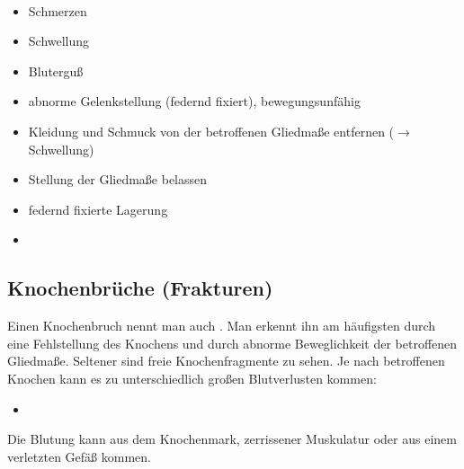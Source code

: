 \paragraph{\TxSymptome}
\begin{itemize}
  \item Schmerzen
  \item Schwellung
  \item Bluterguß
  \item abnorme Gelenkstellung (federnd fixiert), bewegungsunfähig
\end{itemize}

{
\begin{itemize}
  \item Kleidung und Schmuck von der betroffenen Gliedmaße entfernen 
  ($\rightarrow$ Schwellung)
  \item Stellung der Gliedmaße belassen
  \item federnd fixierte Lagerung
  \item {}
\end{itemize}
}



\subsection{Knochenbrüche (Frakturen)}
\label{topic:frakturen}

Einen Knochenbruch nennt man auch . Man erkennt ihn am  häufigsten
durch eine Fehlstellung des Knochens und durch abnorme Beweglichkeit  der
betroffenen Gliedmaße. Seltener sind freie Knochenfragmente zu sehen.  Je nach
betroffenen Knochen kann es zu unterschiedlich großen Blutverlusten kommen:
\begin{itemize}
  \item {}
\end{itemize}
Die Blutung kann aus dem Knochenmark, zerrissener Muskulatur oder aus einem 
verletzten Gefäß kommen.

